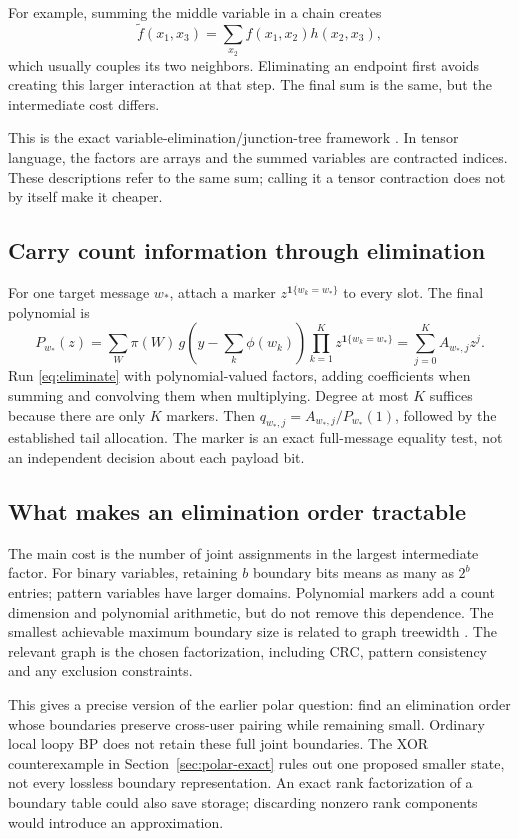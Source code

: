 \documentclass[10pt,a4paper]{article}
\newcommand{\ind}{\mathbf 1}
\begin{document}
For example, summing the middle variable in a chain creates
\[
 \widetilde f(x_1,x_3)=\sum_{x_2}f(x_1,x_2)h(x_2,x_3),
\]
which usually couples its two neighbors.
Eliminating an endpoint first avoids creating this larger interaction at that step.
The final sum is the same, but the intermediate cost differs.

This is the exact variable-elimination/junction-tree framework \cite{wainwright}.
In tensor language, the factors are arrays and the summed variables are contracted indices.
These descriptions refer to the same sum; calling it a tensor contraction does not by itself make it cheaper.

\subsection{Carry count information through elimination}
For one target message $w_*$, attach a marker $z^{\ind\{w_k=w_*\}}$ to every slot. The final polynomial is
\begin{equation}
 P_{w_*}(z)=
 \sum_W\pi(W)\,g\!\left(y-\sum_k\phi(w_k)\right)
             \prod_{k=1}^K z^{\ind\{w_k=w_*\}}
 =\sum_{j=0}^K A_{w_*,j}z^j.
 \label{eq:elimination-marker}
\end{equation}
Run \eqref{eq:eliminate} with polynomial-valued factors, adding coefficients when summing and convolving them
when multiplying. Degree at most $K$ suffices because there are only $K$ markers.
Then $q_{w_*,j}=A_{w_*,j}/P_{w_*}(1)$, followed by the established tail allocation.
The marker is an exact full-message equality test, not an independent decision about each payload bit.

\clearpage
\subsection{What makes an elimination order tractable}
The main cost is the number of joint assignments in the largest intermediate factor.
For binary variables, retaining $b$ boundary bits means as many as $2^b$ entries; pattern variables have larger
domains. Polynomial markers add a count dimension and polynomial arithmetic, but do not remove this dependence.
The smallest achievable maximum boundary size is related to graph treewidth \cite{wainwright}.
The relevant graph is the chosen factorization, including CRC, pattern consistency and any exclusion constraints.

This gives a precise version of the earlier polar question: find an elimination order whose boundaries preserve
cross-user pairing while remaining small. Ordinary local loopy BP does not retain these full joint boundaries.
The XOR counterexample in Section~\ref{sec:polar-exact} rules out one proposed smaller state, not every
lossless boundary representation. An exact rank factorization of a boundary table could also save storage;
discarding nonzero rank components would introduce an approximation.
\end{document}

